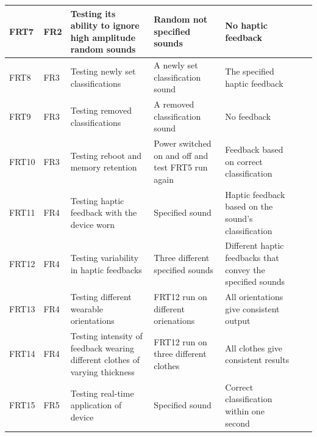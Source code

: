 \documentclass[12pt, titlepage]{article}
\begin{document}
\begin{longtable}{|p{1.4cm}|p{1cm}|p{3cm}|p{1.5cm}|p{2.5cm}|p{2cm}|p{1.2cm}|}
  FRT7        & FR2          & Testing its ability to ignore high amplitude random sounds                   & Random not specified sounds                       & No haptic feedback                                          &                        &                                                    \\ \hline
  FRT8        & FR3          & Testing newly set classifications                                            & A newly set classification sound                  & The specified haptic feedback                               &                        &                                                    \\ \hline
  FRT9        & FR3          & Testing removed classifications                                              & A removed classification sound                    & No feedback                                                 &                        &                                                    \\ \hline
  FRT10       & FR3          & Testing reboot and memory retention                                          & Power switched on and off and test FRT5 run again & Feedback based on correct classification                    &                        &                                                    \\ \hline
  FRT11       & FR4          & Testing haptic feedback with the device worn                                 & Specified sound                                   & Haptic feedback based on the sound's classification         &                        &                                                    \\ \hline
  FRT12       & FR4          & Testing variability in haptic feedbacks                                      & Three different specified sounds                  & Different haptic feedbacks that convey the specified sounds &                        &                                                    \\ \hline
  FRT13       & FR4          & Testing different wearable orientations                                      & FRT12 run on different orienations                & All orientations give consistent output                     &                        &                                                    \\ \hline
  FRT14       & FR4          & Testing intensity of feedback wearing different clothes of varying thickness & FRT12 run on three different clothes              & All clothes give consistent results                         &                        &                                                    \\ \hline
  FRT15       & FR5          & Testing real-time application of device                                      & Specified sound                                   & Correct classification within one second                    &                        &                                                    \\ \hline
\end{longtable}
\end{document}
